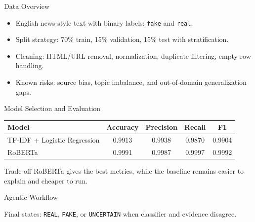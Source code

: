 \documentclass[aspectratio=169]{beamer}
\begin{document}
\begin{frame}{Data Overview}
  \begin{itemize}
    \item English news-style text with binary labels: \texttt{fake} and \texttt{real}.
    \item Split strategy: 70\% train, 15\% validation, 15\% test with stratification.
    \item Cleaning: HTML/URL removal, normalization, duplicate filtering, empty-row handling.
    \item Known risks: source bias, topic imbalance, and out-of-domain generalization gaps.
  \end{itemize}
\end{frame}

\begin{frame}{Model Selection and Evaluation}
  \begin{table}
    \centering
    \small
    \begin{tabular}{lcccc}
      \toprule
      Model & Accuracy & Precision & Recall & F1 \\
      \midrule
      TF-IDF + Logistic Regression & 0.9913 & 0.9938 & 0.9870 & 0.9904 \\
      RoBERTa & 0.9991 & 0.9987 & 0.9997 & 0.9992 \\
      \bottomrule
    \end{tabular}
  \end{table}
  \vspace{0.3em}
  \begin{block}{Trade-off}
    RoBERTa gives the best metrics, while the baseline remains easier to explain and cheaper to run.
  \end{block}
\end{frame}

\begin{frame}{Agentic Workflow}
\centering
{}

\vspace{0.35em}
\small Final states: \texttt{REAL}, \texttt{FAKE}, or \texttt{UNCERTAIN} when classifier and evidence disagree.
\end{frame}
\end{document}
